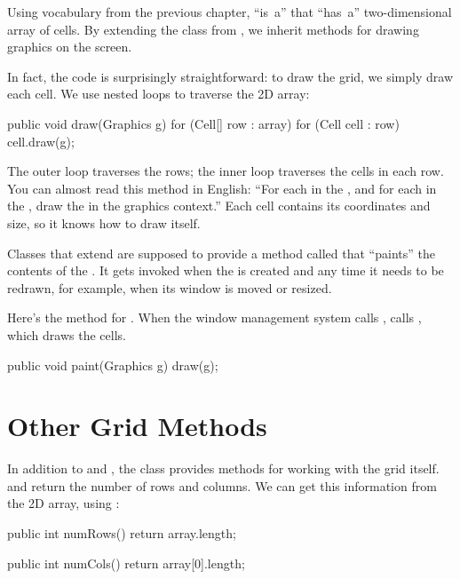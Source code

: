 
Using vocabulary from the previous chapter,  ``is~a''  that ``has~a'' two-dimensional array of cells.
By extending the  class from , we inherit methods for drawing graphics on the screen.

In fact, the code is surprisingly straightforward: to draw the grid, we simply draw each cell.
We use nested  loops to traverse the 2D array:

\begin{code}
public void draw(Graphics g) {
    for (Cell[] row : array) {
        for (Cell cell : row) {
            cell.draw(g);
        }
    }
}
\end{code}

The outer loop traverses the rows; the inner loop traverses the cells in each row.
You can almost read this method in English: ``For each  in the , and for each  in the , draw the  in the graphics context.''
Each cell contains its coordinates and size, so it knows how to draw itself.

Classes that extend  are supposed to provide a method called  that ``paints'' the contents of the .
It gets invoked when the  is created and any time it needs to be redrawn, for example, when its window is moved or resized.

Here's the  method for .
When the window management system calls ,  calls , which draws the cells.

\begin{code}
public void paint(Graphics g) {
    draw(g);
}
\end{code}


\section{Other Grid Methods}

In addition to  and , the  class provides methods for working with the grid itself.
 and  return the number of rows and columns.
We can get this information from the 2D array, using :

\begin{code}
public int numRows() {
    return array.length;
}

public int numCols() {
    return array[0].length;
}
\end{code}

